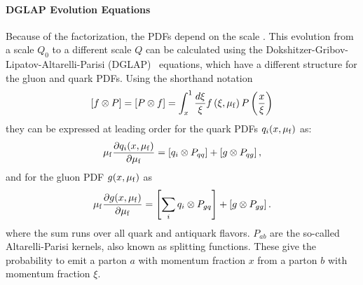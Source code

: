 \paragraph{DGLAP Evolution Equations}

Because of the factorization, the PDFs depend on the scale \muf. This evolution
from a scale $Q_0$ to a different scale $Q$ can be calculated using the
Dokshitzer-Gribov-Lipatov-Altarelli-Parisi
(DGLAP)~\cite{Gribov:1972ri,Altarelli:1977zs,Dokshitzer:1977sg} equations, which
have a different structure for the gluon and quark PDFs. Using the shorthand notation
%
\begin{equation*}
    \left[f \otimes P \right] = \left[ P \otimes f \right] = \int_x^1 \frac{d
    \xi}{\xi} f\left(\xi, \mu_{\mathrm{f}}\right) P\left( \frac{x}{\xi} \right)
\end{equation*}
%
they can be expressed at leading order for the quark PDFs $q_i(x, \mu_{\mathrm{f}})$ as:
\begin{equation*}
    \mu_{\mathrm{f}} \frac{\partial q_i (x, \mu_{\mathrm{f}})}{\partial \mu_{\mathrm{f}}} = \left[ q_i \otimes P_{qq}
    \right] + \left[ g \otimes P_{qg} \right],
\end{equation*}
%
and for the gluon PDF $g(x, \mu_{\mathrm{f}})$ as
%
\begin{equation*}
    \mu_{\mathrm{f}} \frac{\partial g (x, \mu_{\mathrm{f}})}{\partial \mu_{\mathrm{f}}} = \left[\sum_i  q_i \otimes P_{gq}
    \right] + \left[g \otimes P_{gg}\right].
\end{equation*}
%
where the sum runs over all quark and antiquark flavors. $P_{ab}$ are the
so-called Altarelli-Parisi kernels, also known as splitting functions. These
give the probability to emit a parton $a$ with momentum fraction $x$ from a
parton $b$ with momentum fraction $\xi$.


